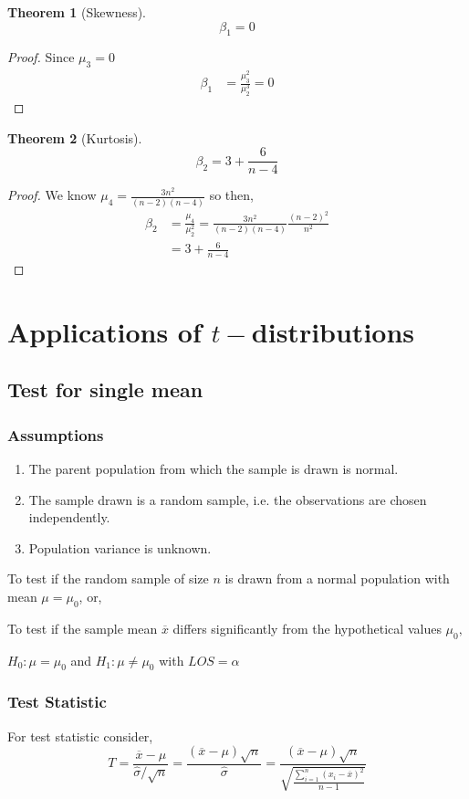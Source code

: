 \documentclass[oneside,11pt,pdftex]{book}%
\numberwithin{equation}{section}
\newtheorem{theorem}{Theorem}[chapter]%
\numberwithin{section}{chapter}
\numberwithin{equation}{chapter}
\begin{document}
\begin{theorem}[Skewness]
	$$ \beta_1=0 $$
\end{theorem}
\begin{proof}
	Since $ \mu_3=0 $
	\begin{align*}
		\beta_1&=\frac{\mu_3^2}{\mu_2^3}=0
	\end{align*}
\end{proof}

\begin{theorem}[Kurtosis]
	\[ \beta_2=3+\frac{6}{n-4} \]
\end{theorem}
\begin{proof}
	We know $ \mu_4=\frac{3n^2}{(n-2)(n-4)} $ so then,
	\begin{align*}
		\beta_2&=\frac{\mu_4}{\mu_2^2}=\frac{3n^2}{(n-2)(n-4)} \frac{(n-2)^2}{n^2}\\
		&=3+\frac{6}{n-4}
	\end{align*}
\end{proof}

\section{Applications of $ t- $distributions}
\subsection{Test for single mean}
\subsubsection{Assumptions}
\begin{enumerate}
	\item The parent population from which the sample is drawn is normal.
	\item The sample drawn is a random sample, i.e. the observations are chosen independently.
	\item Population variance is unknown.
\end{enumerate}
To test if the random sample of size $ n $ is drawn from a normal population with mean $ \mu=\mu_0 $, or,

To test if the sample mean $ \overline{x} $ differs significantly from the hypothetical values $ \mu_0, $

$ H_0:\mu=\mu_0 $ and $ H_1:\mu \neq \mu_0 $ with $ LOS=\alpha $
\subsubsection{Test Statistic}
For test statistic consider,
\[ T=\frac{\overline{x}-\mu}{\hat{\sigma}/\sqrt{n}} =\frac{(\overline{x}-\mu)\sqrt{n}}{\hat{\sigma}}=\frac{(\overline{x}-\mu)\sqrt{n}}{\sqrt{\frac{\sum_{i=1}^n (x_i-\overline{x})^2}{n-1}}}\]
\end{document}
